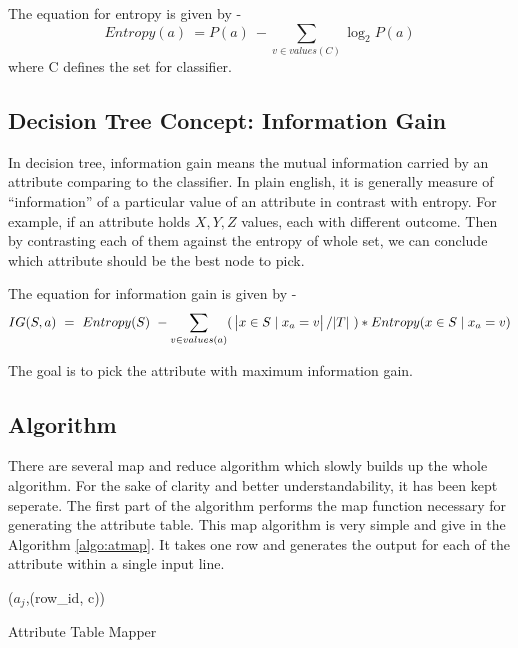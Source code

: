 \documentclass{article}
\begin{document}
The equation for entropy is given by -
\begin{equation}
Entropy(a)\ = P(a)\ - \sum_{v \in values(C)}\log_{2}{P(a)}
\end{equation}
where C defines the set for classifier.

\subsection{Decision Tree Concept: Information Gain}
In decision tree, information gain means the mutual information carried by an attribute comparing to the classifier\cite{wikiinfogain}. In plain english, it is generally measure of ``information'' of a particular value of an attribute in contrast with entropy. For example, if an attribute holds ${X,Y,Z}$ values, each with different outcome. Then by contrasting each of them against the entropy of whole set, we can conclude which attribute should be the best node to pick.

The equation for information gain is given by -
\begin{equation}
IG(S, a)\ =\ Entropy(S)\ - \sum_{v \in values(a)}(\ \abs{x \in S\mid x_{a} = v}/\abs{T}\ ) * Entropy(x \in S\mid x_{a} = v)
\end{equation}

The goal is to pick the attribute with maximum information gain.

\subsection{Algorithm}

There are several map and reduce algorithm which slowly builds up the whole algorithm. For the sake of clarity and better understandability, it has been kept seperate. The first part of the algorithm performs the map function necessary for generating the attribute table. This map algorithm is very simple and give in the Algorithm \ref{algo:atmap}. It takes one row and generates the output for each of the attribute within a single input line.

\IncMargin{1em}
\begin{algorithm}[H]
\DontPrintSemicolon
{}
\BlankLine
\emit(${a_{j}}$,(row\_id, c))
\caption{Attribute Table Mapper\label{algo:atmap}}
\end{algorithm}
\DecMargin{1em}
\end{document}
